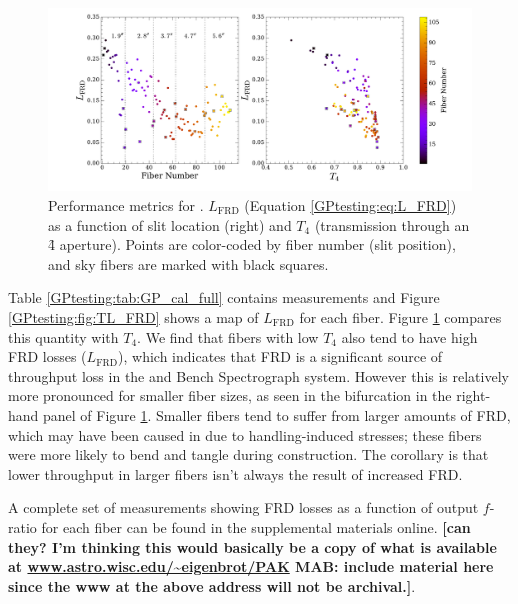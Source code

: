 \begin{figure}
  \centering
  \includegraphics[width=\textwidth]{Appendix/figs/gradpak_Lplots.pdf}
  \caption[\GP on-bench FRD
  losses]{\label{GPtesting:fig:FRD_loss}\fixspacing Performance
    metrics for \GP. $L_\mathrm{FRD}$ (Equation
    \ref{GPtesting:eq:L_FRD}) as a function of slit location (right)
    and $T_4$ (transmission through an \f4 aperture). Points are
    color-coded by fiber number (slit position), and sky fibers are
    marked with black squares.}
\end{figure}

Table \ref{GPtesting:tab:GP_cal_full} contains measurements and Figure
\ref{GPtesting:fig:TL_FRD} shows a map of $L_\mathrm{FRD}$ for each
\GP fiber. Figure \ref{GPtesting:fig:FRD_loss} compares this quantity
with $T_4$. We find that fibers with low $T_4$ also tend to have high
FRD losses ($L_\mathrm{FRD}$), which indicates that FRD is a
significant source of throughput loss in the \GP and Bench
Spectrograph system.  However this is relatively more pronounced for
smaller fiber sizes, as seen in the bifurcation in the right-hand
panel of Figure \ref{GPtesting:fig:FRD_loss}. Smaller fibers tend to
suffer from larger amounts of FRD, which may have been caused in \GP
due to handling-induced stresses; these fibers were more likely to
bend and tangle during construction.  The corollary is that lower
throughput in larger fibers isn't always the result of increased FRD.

A complete set of measurements showing FRD losses as a function of
output $f$-ratio for each fiber can be found in the supplemental
materials online. {\bf [can they? I'm thinking this would basically be
    a copy of what is available at
    \url{www.astro.wisc.edu/~eigenbrot/PAK} MAB: include material here
    since the www at the above address will not be archival.]}.

% 




